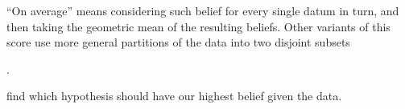 \documentclass[\ifafour a4paper,12pt,\else a5paper,10pt,\fi%
onecolumn,oneside,article,%
british%
]{memoir}
\theoremstyle{remark}
\theoremstyle{innote}
\newcommand*{\defd}{\coloneqq}
\DeclarePairedDelimiter\set{\{}{\}}
\newcommand*{\p}{\mathrm{P}}%
\renewcommand*{\|}[1][]{\nonscript\,#1\vert\nonscript\;\mathopen{}}
\newcommand*{\prop}[1]{\text{\textquoteleft}#1\text{\textquoteright}}
\newcommand*{\propf}[1]{\,#1\,}
\newcommand*{\yK}{I}
\newcommand*{\eq}{\mathrel{\!=\!}}
\begin{document}














\enquote{On average} means considering such belief for every single datum
in turn, and then taking the geometric mean of the resulting
beliefs. %
Other variants of this score use more general partitions of the data into
two disjoint subsets\addtocounter{footnote}{-1}\footnotemark{}.



find which hypothesis should have our highest belief
given the data.
\end{document}
